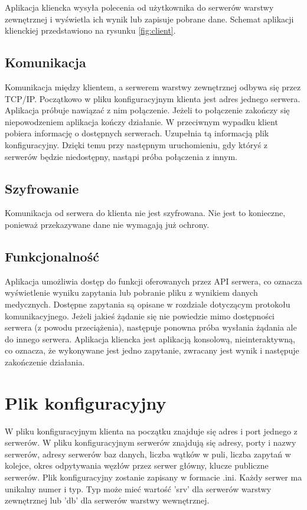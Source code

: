 Aplikacja kliencka wysyła polecenia od użytkownika do serwerów warstwy zewnętrznej i wyświetla ich wynik lub zapisuje pobrane dane. Schemat aplikacji klienckiej przedstawiono na rysunku \ref{fig:client}.

\subsection{Komunikacja}
Komunikacja między klientem, a serwerem warstwy zewnętrznej odbywa się przez TCP/IP. Początkowo w pliku konfiguracyjnym klienta jest adres jednego serwera. Aplikacja próbuje nawiązać z nim połączenie. Jeżeli to połączenie zakończy się niepowodzeniem aplikacja kończy działanie. W przeciwnym wypadku klient pobiera informację o dostępnych serwerach. Uzupełnia tą informacją plik konfiguracyjny. Dzięki temu przy następnym uruchomieniu, gdy któryś z serwerów będzie niedostępny, nastąpi próba połączenia z innym.

\subsection{Szyfrowanie}
Komunikacja od serwera do klienta nie jest szyfrowana. Nie jest to konieczne, ponieważ przekazywane dane nie wymagają już ochrony.

\subsection{Funkcjonalność}
Aplikacja umożliwia dostęp do funkcji oferowanych przez API serwera, co oznacza wyświetlenie wyniku zapytania lub pobranie pliku z wynikiem danych medycznych. Dostępne zapytania są opisane w rozdziale dotyczącym protokołu komunikacyjnego. Jeżeli jakieś żądanie się nie powiedzie mimo dostępności serwera (z powodu przeciążenia), następuje ponowna próba wysłania żądania ale do innego serwera.
Aplikacja kliencka jest aplikacją konsolową, nieinteraktywną, co oznacza, że wykonywane jest jedno zapytanie, zwracany jest wynik i następuje zakończenie działania.
\section{Plik konfiguracyjny}

W pliku konfiguracyjnym klienta na początku znajduje się adres i port jednego z serwerów.
W pliku konfiguracyjnym serwerów znajdują się adresy, porty i nazwy serwerów, adresy serwerów baz danych, liczba wątków w puli, liczba zapytań w kolejce, okres odpytywania węzłów przez serwer główny, klucze publiczne serwerów.
Plik konfiguracyjny zostanie zapisany w formacie .ini.
Każdy serwer ma unikalny numer i typ. Typ może mieć wartość 'srv' dla serwerów warstwy zewnętrznej lub 'db' dla serwerów warstwy wewnętrznej.

